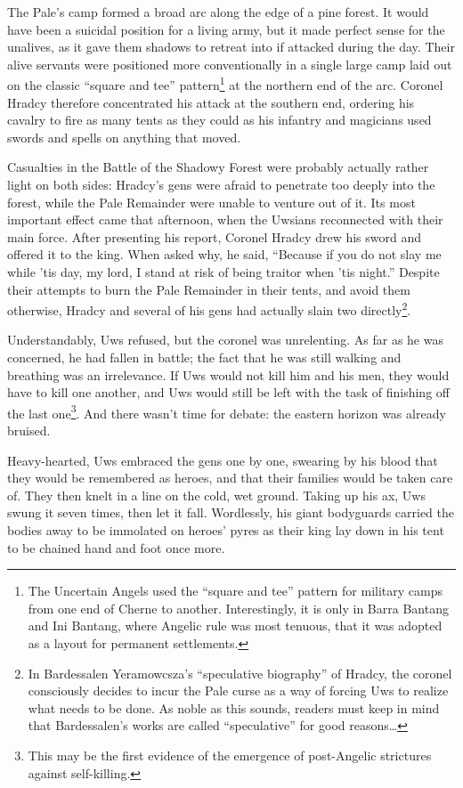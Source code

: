 \documentclass[12pt]{report}
\begin{document}
The Pale's camp formed a broad arc along the edge of a pine forest.
It would have been a suicidal position for a living army, but it made
perfect sense for the unalives, as it gave them shadows to retreat
into if attacked during the day.  Their alive servants were positioned
more conventionally in a single large camp laid out on the classic
``square and tee'' pattern\footnote{The Uncertain Angels used the
``square and tee'' pattern for military camps from one end of Cherne to
another.  Interestingly, it is only in Barra Bantang and Ini Bantang,
where Angelic rule was most tenuous, that it was adopted as a layout
for permanent settlements.} at the northern end of the arc.  Coronel
Hradcy therefore concentrated his attack at the southern end, ordering
his cavalry to fire as many tents as they could as his infantry and
magicians used swords and spells on anything that moved.

Casualties in the Battle of the Shadowy Forest were probably actually
rather light on both sides: Hradcy's gens were afraid to penetrate too
deeply into the forest, while the Pale Remainder were unable to
venture out of it.  Its most important effect came that afternoon,
when the Uwsians reconnected with their main force.  After presenting
his report, Coronel Hradcy drew his sword and offered it to the king.
When asked why, he said, ``Because if you do not slay me while 'tis
day, my lord, I stand at risk of being traitor when 'tis night.''
Despite their attempts to burn the Pale Remainder in their tents, and
avoid them otherwise, Hradcy and several of his gens had actually
slain two directly\footnote{In Bardessalen Yeramowcsza's ``speculative
biography'' of Hradcy, the coronel consciously decides to incur the
Pale curse as a way of forcing Uws to realize what needs to be done.
As noble as this sounds, readers must keep in mind that Bardessalen's
works are called ``speculative'' for good reasons{\ldots}}.

Understandably, Uws refused, but the coronel was unrelenting.  As far
as he was concerned, he had fallen in battle; the fact that he was
still walking and breathing was an irrelevance.  If Uws would not kill
him and his men, they would have to kill one another, and Uws would
still be left with the task of finishing off the last
one\footnote{This may be the first evidence of the emergence of
post-Angelic strictures against self-killing.}.  And there wasn't time
for debate: the eastern horizon was already bruised.

Heavy-hearted, Uws embraced the gens one by one, swearing by his blood
that they would be remembered as heroes, and that their families would
be taken care of.  They then knelt in a line on the cold, wet ground.
Taking up his ax, Uws swung it seven times, then let it fall.
Wordlessly, his giant bodyguards carried the bodies away to be
immolated on heroes' pyres as their king lay down in his tent to be
chained hand and foot once more.
\end{document}
